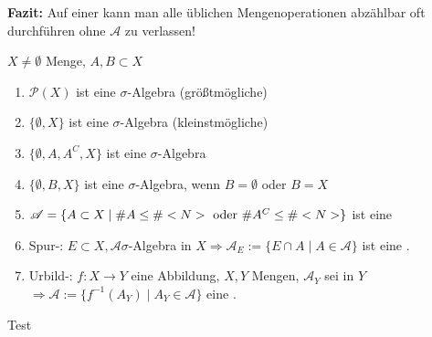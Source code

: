 \textbf{Fazit:} Auf einer \sigmalg kann man alle üblichen Mengenoperationen abzählbar oft durchführen ohne $\mathscr{A}$ zu verlassen!

\begin{example}
	$X\neq\emptyset$ Menge, $A,B\subset X$
	\begin{enumerate}[label=(\alph*)]
		\item $\mathscr{P}(X)$ ist eine $\sigma$-Algebra (größtmögliche)
		\item $\{\emptyset,X\}$ ist eine $\sigma$-Algebra (kleinstmögliche)
		\item $\{\emptyset,A,A^C,X\}$ ist eine $\sigma$-Algebra
		\item $\{\emptyset,B,X\}$ ist eine $\sigma$-Algebra, wenn $B=\emptyset$ oder $B=X$
		\item $\mathscr{A}=\{A\subset X\mid \#A\le \#<N>\text{ oder } \#A^C\le \#<N>\}$ ist eine \sigmalg %
		\item Spur-\sigmalg: $E \subset X,\mathscr{A} \sigma$-Algebra in $X \Rightarrow \mathscr{A}_E := \{E \cap A \mid A \in \mathscr{A}\}$ ist eine \sigmalg.
		\item Urbild-\sigmalg: $f: X \to Y$ eine Abbildung, $X,Y$ Mengen, $\mathscr{A}_Y$ sei \sigmalg  in $Y$ $\Rightarrow \mathscr{A} := \{f^{-1}(A_Y)\mid A_Y \in \mathscr{A}\}$ eine \sigmalg.
	\end{enumerate}
\end{example}

\begin{hint}
	Test
\end{hint}